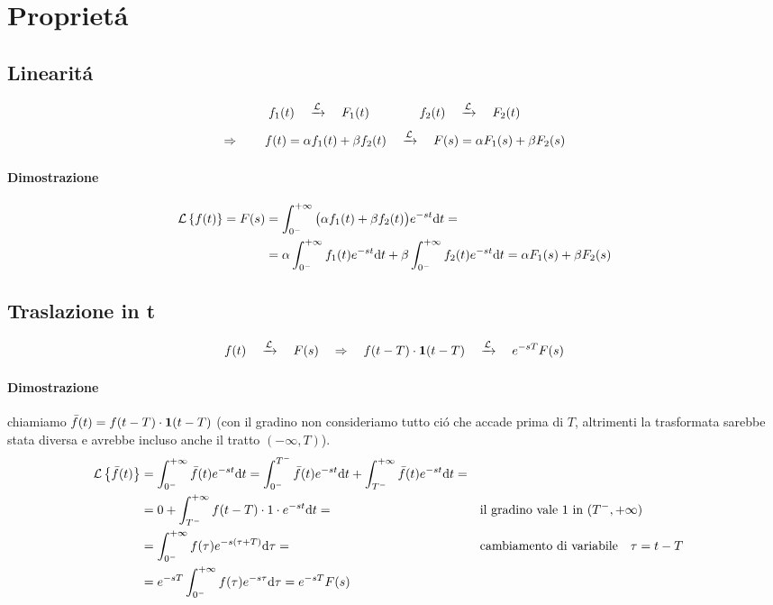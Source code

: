 \documentclass[../main.tex]{subfiles}
\begin{document}
	\section{Propriet\'{a}}
	\subsection{Linearit\'{a}}
	\label{sec:linear}
		\[
			\Lapl{f_{1}(t)}{F_{1}(t)} \qquad\qquad \Lapl{f_{2}(t)}{F_{2}(t)}
		\]
		\[
			\Rightarrow\qquad \Lapl{f(t)=\alpha f_{1}(t) + \beta f_{2}(t)}{F(s)=\alpha F_{1}(s) + \beta F_{2}(s)}
		\]
		\paragraph{Dimostrazione}
		\begin{align*}
			\Lbrace{f(t)} = F(s) &= \LaplDef{\big( \alpha f_{1}(t) + \beta f_{2}(t) \big)}{s}{t} =
			\\
			&= \alpha \LaplDef{f_{1}(t)}{s}{t} + \beta \LaplDef{f_{2}(t)}{s}{t} = \alpha F_{1}(s) + \beta F_{2}(s)
		\end{align*}

	\subsection{Traslazione in t}
	\label{sec:trasl_t}
		\[
			\Lapl{f(t)}{F(s)} \quad\Rightarrow\quad \Lapl{f(t-T) \cdot \gr[t-T]}{e^{-sT}F(s)}
		\]
		\paragraph{Dimostrazione}
		chiamiamo $ \bar{f}(t) = f(t-T) \cdot \gr[t-T] $ (con il gradino non consideriamo tutto ci\'{o} che accade prima di $ T $, altrimenti la trasformata sarebbe stata diversa e avrebbe incluso anche il tratto $ (-\infty,T) $).
		\begin{align*}
			\Lbrace{\bar{f}(t)} &= \LaplDef{\bar{f}(t)}{s}{t} = \int_{0^{-}}^{T^{-}} \bar{f}(t) e^{-st} \mathrm{d}t + \int_{T^{-}}^{+ \infty} \bar{f}(t) e^{-st} \mathrm{d}t =
			\\
			&= 0+ \int_{T^{-}}^{+ \infty} f(t-T) \cdot 1 \cdot e^{-st} \mathrm{d}t=
			&&\text{il gradino vale 1 in } (T^{-},+ \infty)
			\\
			&= \int_{0^{-}}^{+ \infty} f(\tau) e^{-s(\tau+T)} \mathrm{d}\tau = &&\text{cambiamento di variabile} \quad \tau=t-T
			\\
			&= e^{-sT} \LaplDef{f(\tau)}{s}{\tau} = e^{-sT} F(s)
		\end{align*}
	
\end{document}
